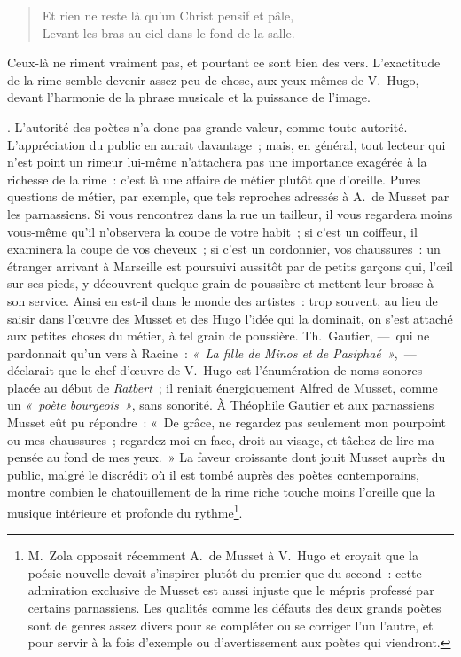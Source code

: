 \documentclass[french,twoside]{book} %
\begin{document}
{\begin{verse}
Et rien ne reste là qu’un Christ pensif et pâle,\\
Levant les bras au ciel dans le fond de la salle.\\
\end{verse}
\par
\noindent Ceux-là ne riment vraiment pas, et pourtant ce sont bien des vers. L’exactitude de la rime semble devenir assez peu de chose, aux yeux mêmes de V. Hugo, devant l’harmonie de la phrase musicale et la puissance de l’image.
}. L’autorité des poètes n’a donc pas grande valeur, comme  toute autorité. L’appréciation du public en aurait davantage ; mais, en général, tout lecteur qui n’est point un rimeur lui-même n’attachera pas une importance exagérée à la richesse de la rime : c’est là une affaire de métier plutôt que d’oreille. Pures questions de métier, par exemple, que tels reproches adressés à A. de Musset par les parnassiens. Si vous rencontrez dans la rue un tailleur, il vous regardera moins vous-même qu’il n’observera la coupe de votre habit ; si c’est un coiffeur, il examinera la coupe de vos cheveux ; si c’est un cordonnier, vos chaussures : un étranger arrivant à Marseille est poursuivi aussitôt par de petits garçons qui, l’œil sur ses pieds, y découvrent quelque grain de poussière et mettent leur brosse à son service. Ainsi en est-il dans le monde des artistes : trop souvent, au lieu de saisir dans l’œuvre des Musset et des Hugo l’idée qui la dominait, on s’est attaché aux petites choses du métier, à tel grain de poussière. Th. Gautier, — qui ne pardonnait qu’un vers à Racine : \emph{« La fille de Minos et de Pasiphaé »}, — déclarait que le chef-d’œuvre de V. Hugo est l’énumération de noms sonores placée au début de \emph{Ratbert} ; il reniait énergiquement Alfred de Musset, comme un \emph{« poète bourgeois »}, sans sonorité. À Théophile Gautier et aux parnassiens Musset eût pu répondre : « De grâce, ne regardez pas seulement mon pourpoint ou mes chaussures ; regardez-moi en face, droit au visage, et tâchez de lire ma pensée au fond de mes yeux. » La faveur croissante dont jouit Musset auprès du public, malgré le discrédit où il est tombé auprès des poètes contemporains, montre combien le chatouillement de la rime riche touche  moins l’oreille que la musique intérieure et profonde du rythme\footnote{M. Zola opposait récemment A. de Musset à V. Hugo et croyait que la poésie nouvelle devait s’inspirer plutôt du premier que du second : cette admiration exclusive de Musset est aussi injuste que le mépris professé par certains parnassiens. Les qualités comme les défauts des deux grands poètes sont de genres assez divers pour se compléter ou se corriger l’un l’autre, et pour servir à la fois d’exemple ou d’avertissement aux poètes qui viendront.}.\par
\end{document}

